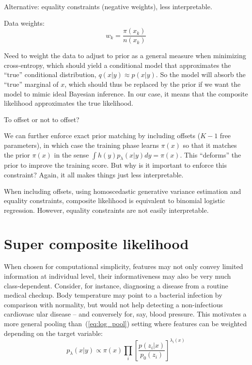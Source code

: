 \documentclass[english]{scrartcl}
\begin{document}
Alternative: equality constraints (negative weights), less interpretable.

Data weights: 
$$
w_k = \frac{\pi(x_k)}{n(x_k)}
$$

Need to weight the data to adjust to prior as a general measure when minimizing cross-entropy, which should yield a conditional model that approximates the ``true'' conditional distribution, $q(x|y)\approx p(x|y)$. So the model will absorb the ``true'' marginal of $x$, which should thus be replaced by the prior if we want the model to mimic ideal Bayesian inference. In our case, it means that the composite likelihood approximates the true likelihood.

{\color{red} To offset or not to offset?}

We can further enforce exact prior matching by including offsets ($K-1$ free parameters), in which case the training phase learns $\pi(x)$ so that it matches the prior $\pi(x)$ in the sense $\int h(y)p_\lambda(x|y)dy = \pi(x)$. This ``deforms'' the prior to improve the training score. But why is it important to enforce this constraint? Again, it all makes things just less interpretable. 

When including offsets, using homoscedastic generative variance estimation and equality constraints, composite likelihood is equivalent to binomial logistic regression. However, equality constraints are not easily interpretable.




\section{Super composite likelihood}
\label{sec:super}

When chosen for computational simplicity, features may not only convey limited information at individual level, their informativeness may also be very much class-dependent. Consider, for instance, diagnosing a disease from a routine medical checkup. Body temperature may point to a bacterial infection by comparison with normality, but would not help detecting a non-infectious cardiovasc ular disease -- and conversely for, say, blood pressure. This motivates a more general pooling than~(\ref{eq:log_pool}) setting where features can be weighted depending on the target variable:
$$
p_\lambda(x|y) \propto \pi(x) \prod_i \left[\frac{p(z_i|x)}{p_0(z_i)}\right]^{\lambda_i(x)}
$$
\end{document}
